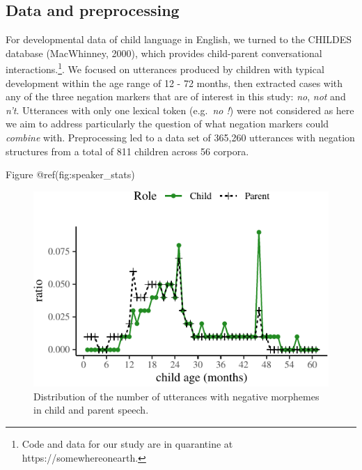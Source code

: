 \documentclass[10pt, letterpaper]{article}
\newenvironment{CodeChunk}{}{}
\begin{document}
\hypertarget{data-and-preprocessing}{%
\subsection{Data and preprocessing}\label{data-and-preprocessing}}

For developmental data of child language in English, we turned to the
CHILDES database (MacWhinney, 2000), which provides child-parent
conversational
interactions.\footnote{Code and data for our study are in quarantine at https://somewhereonearth.}.
We focused on utterances produced by children with typical development
within the age range of 12 - 72 months, then extracted cases with any of
the three negation markers that are of interest in this study:
\emph{no}, \emph{not} and \emph{n't}. Utterances with only one lexical
token (e.g.~\emph{no !}) were not considered as here we aim to address
particularly the question of what negation markers could \emph{combine}
with. Preprocessing led to a data set of 365,260 utterances with
negation structures from a total of 811 children across 56 corpora.

Figure @ref(fig:speaker\_stats)

\begin{CodeChunk}
\begin{figure}[H]

{\centering \includegraphics{figs/speaker_stats-1} 

}

\caption[Distribution of the number of utterances with negative morphemes in child and parent speech]{Distribution of the number of utterances with negative morphemes in child and parent speech.}\label{fig:speaker_stats}
\end{figure}
\end{CodeChunk}
\end{document}
